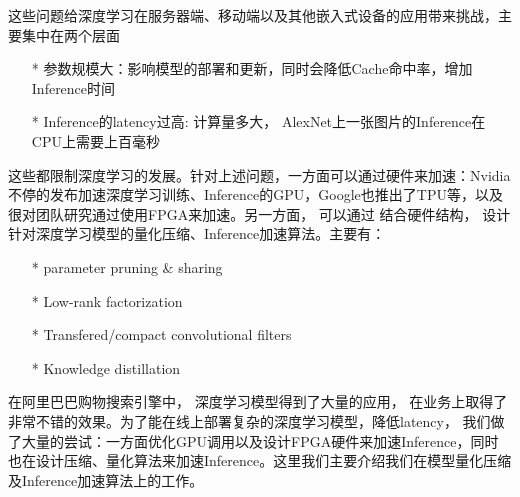 这些问题给深度学习在服务器端、移动端以及其他嵌入式设备的应用带来挑战，主要集中在两个层面
\begin{itemize}
\item[*] 参数规模大：影响模型的部署和更新，同时会降低Cache命中率，增加Inference时间
\item[*] Inference的latency过高:  计算量多大， AlexNet上一张图片的Inference在CPU上需要上百毫秒
\end{itemize}

这些都限制深度学习的发展。针对上述问题，一方面可以通过硬件来加速：Nvidia不停的发布加速深度学习训练、Inference的GPU，Google也推出了TPU等，以及很对团队研究通过使用FPGA来加速。另一方面， 可以通过
 结合硬件结构， 设计针对深度学习模型的量化压缩、Inference加速算法。主要有：
\begin{itemize}
\item[*]  parameter pruning  \& sharing
\item[*]  Low-rank factorization
\item[*]  Transfered/compact convolutional filters
\item[*]  Knowledge distillation
\end{itemize}
在阿里巴巴购物搜索引擎中， 深度学习模型得到了大量的应用， 在业务上取得了非常不错的效果。为了能在线上部署复杂的深度学习模型，降低latency， 我们做了大量的尝试：一方面优化GPU调用以及设计FPGA硬件来加速Inference，同时也在设计压缩、量化算法来加速Inference。这里我们主要介绍我们在模型量化压缩及Inference加速算法上的工作。

